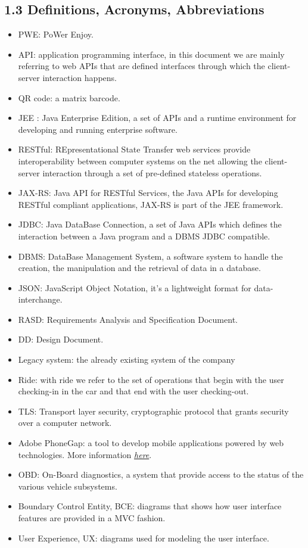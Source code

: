 \documentclass[]{article}
\providecommand{\tightlist}{%
  \setlength{\itemsep}{0pt}\setlength{\parskip}{0pt}}
\begin{document}
\subsection{1.3 Definitions, Acronyms,
Abbreviations}\label{definitions-acronyms-abbreviations}

\begin{itemize}
\tightlist
\item
  PWE: PoWer Enjoy.
\item
  API: application programming interface, in this document we are mainly
  referring to web APIs that are defined interfaces through which the
  client-server interaction happens.
\item
  QR code: a matrix barcode.
\item
  JEE : Java Enterprise Edition, a set of APIs and a runtime environment
  for developing and running enterprise software.
\item
  RESTful: REpresentational State Transfer web services provide
  interoperability between computer systems on the net allowing the
  client-server interaction through a set of pre-defined stateless
  operations.
\item
  JAX-RS: Java API for RESTful Services, the Java APIs for developing
  RESTful compliant applications, JAX-RS is part of the JEE framework.
\item
  JDBC: Java DataBase Connection, a set of Java APIs which defines the
  interaction between a Java program and a DBMS JDBC compatible.
\item
  DBMS: DataBase Management System, a software system to handle the
  creation, the manipulation and the retrieval of data in a database.
\item
  JSON: JavaScript Object Notation, it's a lightweight format for
  data-interchange.
\item
  RASD: Requirements Analysis and Specification Document.
\item
  DD: Design Document.
\item
  Legacy system: the already existing system of the company
\item
  Ride: with ride we refer to the set of operations that begin with the
  user checking-in in the car and that end with the user checking-out.
\item
  TLS: Transport layer security, cryptographic protocol that grants
  security over a computer network.
\item
  Adobe PhoneGap: a tool to develop mobile applications powered by web
  technologies. More information
  \href{http://phonegap.com}{\emph{here}}.
\item
  OBD: On-Board diagnostics, a system that provide access to the status
  of the various vehicle subsystems.
\item
  Boundary Control Entity, BCE: diagrams that shows how user interface
  features are provided in a MVC fashion.
\item
  User Experience, UX: diagrams used for modeling the user interface.
\end{itemize}
\end{document}
